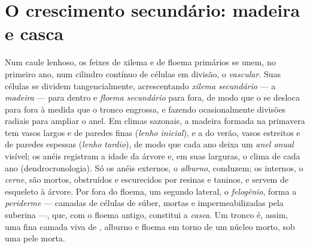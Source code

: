 \section{O crescimento secundário: madeira e casca}

\begin{definition}\label{def:b2:plant-meristems:wood}
Num caule lenhoso, os feixes de xilema e de floema primários se unem,
no primeiro ano, num cilindro contínuo de células em divisão, o
\emph{ vascular}. Suas células se dividem tangencialmente,
acrescentando \emph{xilema secundário} --- a \emph{madeira} --- para
dentro e \emph{floema secundário} para fora, de modo que o  se
desloca para fora à medida que o tronco engrossa, e fazendo
ocasionalmente divisões radiais para ampliar o anel. Em climas
sazonais, a madeira formada na primavera tem vasos largos e de paredes
finas (\emph{lenho inicial}), e a do verão, vasos estreitos e de
paredes espessas (\emph{lenho tardio}), de modo que cada ano deixa um
\emph{anel anual} visível; os anéis registram a idade da árvore e, em
suas larguras, o clima de cada ano (dendrocronologia). Só os anéis
externos, o \emph{alburno}, conduzem; os internos, o \emph{cerne}, são
mortos, obstruídos e escurecidos por resinas e taninos, e servem de
esqueleto à árvore. Por fora do floema, um segundo  lateral, o
\emph{felogênio}, forma a \emph{periderme} --- camadas de células de
súber, mortas e impermeabilizadas pela suberina ---, que, com o floema
antigo, constitui a \emph{casca}. Um tronco é, assim, uma fina camada
viva de , alburno e floema em torno de um núcleo morto, sob uma
pele morta.
\end{definition}

